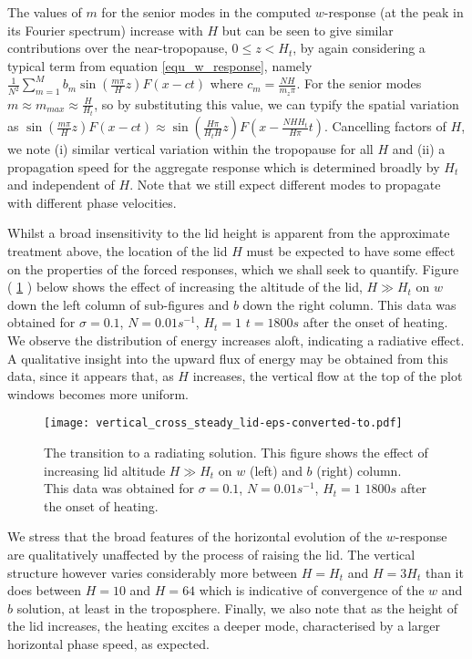\documentclass[a4paper,10pt]{article}
\begin{document}
The values of $m$ for the senior modes in the computed $w$-response (at the peak in its Fourier spectrum) increase with $H$ but can be seen to give similar contributions over 
the near-tropopause, $0 \leq z < H_t$, by again considering a typical term from equation \ref{equ_w_response}, namely $\frac{1}{N^2} \sum_{m=1}^M b_{m} \sin \left( \frac{m \pi}{H} z\right) F(x - c t)$
where $c_m = \frac{N H}{ m_z \pi}$. For the senior modes $m \approx m_{max} \approx \frac{H}{H_t}$, so by substituting this value, 
we can typify the spatial variation as $\sin \left( \frac{m \pi}{H} z\right) F(x - c t) \approx \sin \left( \frac{H \pi}{H_t H} z\right) F \left( x - \frac{N H H_t}{ H \pi} t \right)$.
Cancelling factors of $H$, we note (i) similar vertical variation within the tropopause for all $H$ and (ii) a propagation 
speed for the aggregate response which is determined broadly by $H_t$ and independent of $H$. Note that we
still expect different modes to propagate with different phase velocities.

Whilst a broad insensitivity to the lid height is apparent from the approximate treatment above, the location of the lid $H$ must be expected to have some effect on the
properties of the forced responses, which we shall seek to quantify. Figure ( \ref{vertical_cross_steady_lid} ) below shows the effect of increasing the
altitude of the lid, $H \gg H_t$ on $w$ down the left column of sub-figures and $b$ 
down the right column. This data was obtained for $\sigma = 0.1$, $N= 0.01s^{-1}$, $H_t = 1$ 
$t=1800s$ after the onset of heating. We observe the distribution of energy increases aloft, indicating a
radiative effect. A qualitative insight into the upward flux of energy may be obtained from this
data, since it appears that, as $H$ increases, the vertical flow at the top of the plot windows becomes more uniform.
%
%
\FloatBarrier
\begin{figure}[h!]
  \centering
    \texttt{[image: vertical\_cross\_steady\_lid-eps-converted-to.pdf]}
    \caption{ The transition to a radiating solution. This figure shows the 
  effect of increasing lid altitude $H \gg H_t$ on $w$ (left) and $b$ (right) column. 
  This data was obtained for $\sigma = 0.1$, $N= 0.01s^{-1}$, $H_t = 1$ 
  $1800s$ after the onset of heating.  }
  \label{vertical_cross_steady_lid}
\end{figure}
%
%
%
We stress that the broad features of the horizontal evolution of the $w$-response are 
qualitatively unaffected by the process of raising the lid. The vertical
structure however varies considerably more between $H = H_t$ and  $H = 3H_t$ than it does between
$H = 10$ and $H = 64$ which is indicative of convergence of the $w$ and $b$ solution, at least
in the troposphere. Finally, we also note that as the height of the lid increases, the 
heating excites a deeper mode, characterised by a larger horizontal phase speed, as expected.
%
%
%
\FloatBarrier
%
%
%
\end{document}
